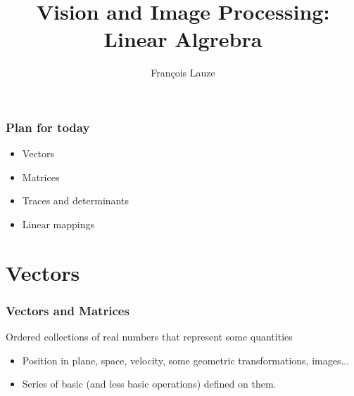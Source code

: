 \documentclass[8pt]{beamer}
\title{Vision and Image Processing:\\ Linear Algrebra}
\author[F.~Lauze] %
{Fran{\c c}ois Lauze}
\institute[DIKU] %
{
  Department of Computer Science\\
  University of Copenhagen
}
\date[2017-18 B2] %
\begin{document}
\maketitle









\begin{frame}
  \frametitle{Plan for today}
  \begin{itemize}
  \item Vectors
  \item Matrices
  \item Traces and determinants
  \item Linear mappings
  \end{itemize}
\end{frame}


\section{Vectors}

\begin{frame}
  \frametitle{Vectors and Matrices}
  Ordered collections of real numbers that represent some quantities
  \begin{itemize}
  \item Position in plane, space, velocity, some geometric transformations, images...
  \item Series of basic (and less basic operations)  defined on them.
  \end{itemize}
\end{frame}
\end{document}
